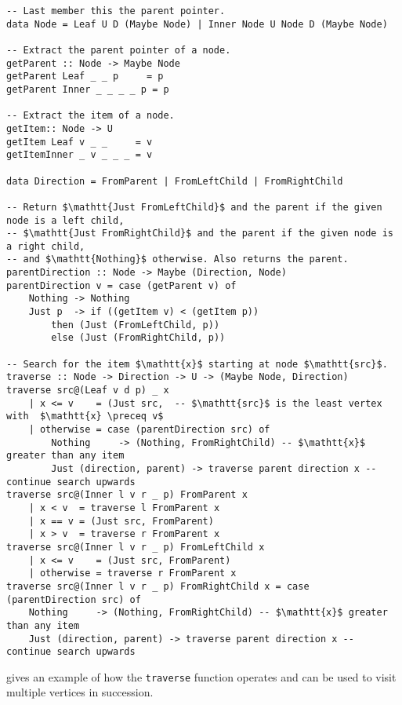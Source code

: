 \begin{verbatim}
-- Last member this the parent pointer.
data Node = Leaf U D (Maybe Node) | Inner Node U Node D (Maybe Node)

-- Extract the parent pointer of a node.
getParent :: Node -> Maybe Node
getParent Leaf _ _ p     = p
getParent Inner _ _ _ _ p = p

-- Extract the item of a node.
getItem:: Node -> U
getItem Leaf v _ _     = v
getItemInner _ v _ _ _ = v

data Direction = FromParent | FromLeftChild | FromRightChild

-- Return $\mathtt{Just FromLeftChild}$ and the parent if the given node is a left child,
-- $\mathtt{Just FromRightChild}$ and the parent if the given node is a right child,
-- and $\mathtt{Nothing}$ otherwise. Also returns the parent.
parentDirection :: Node -> Maybe (Direction, Node)
parentDirection v = case (getParent v) of
    Nothing -> Nothing
    Just p  -> if ((getItem v) < (getItem p))
        then (Just (FromLeftChild, p))
        else (Just (FromRightChild, p))

-- Search for the item $\mathtt{x}$ starting at node $\mathtt{src}$.
traverse :: Node -> Direction -> U -> (Maybe Node, Direction)
traverse src@(Leaf v d p) _ x
    | x <= v    = (Just src,  -- $\mathtt{src}$ is the least vertex with  $\mathtt{x} \preceq v$
    | otherwise = case (parentDirection src) of
        Nothing     -> (Nothing, FromRightChild) -- $\mathtt{x}$ greater than any item
        Just (direction, parent) -> traverse parent direction x -- continue search upwards
traverse src@(Inner l v r _ p) FromParent x
    | x < v  = traverse l FromParent x
    | x == v = (Just src, FromParent)
    | x > v  = traverse r FromParent x
traverse src@(Inner l v r _ p) FromLeftChild x
    | x <= v    = (Just src, FromParent)
    | otherwise = traverse r FromParent x
traverse src@(Inner l v r _ p) FromRightChild x = case (parentDirection src) of
    Nothing     -> (Nothing, FromRightChild) -- $\mathtt{x}$ greater than any item
    Just (direction, parent) -> traverse parent direction x -- continue search upwards
\end{verbatim}

 gives an example of how the \texttt{traverse} function operates and can be used to visit multiple vertices in succession.


\newcommand{\traverse}[3]{\texttt{(traverse #1 #2 #3)}}
\newcommand{\mypair}[2]{\texttt{(#1, #2)}}

